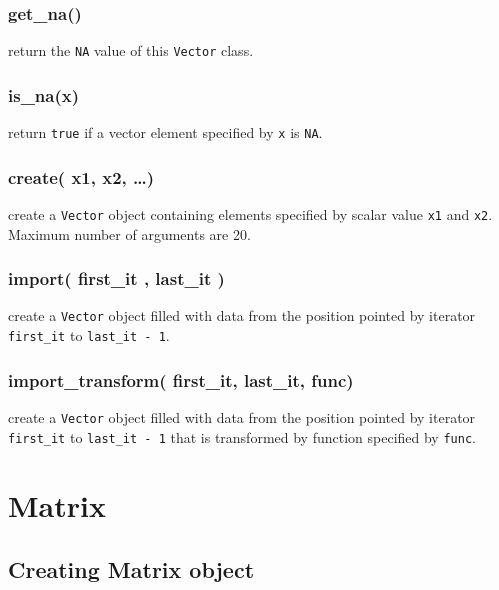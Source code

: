 \documentclass[]{book}
\begin{document}
\hypertarget{get_na}{%
\subsection{get\_na()}\label{get_na}}

return the \texttt{NA} value of this \texttt{Vector} class.

\hypertarget{is_nax}{%
\subsection{is\_na(x)}\label{is_nax}}

return \texttt{true} if a vector element specified by \texttt{x} is \texttt{NA}.

\hypertarget{create-x1-x2}{%
\subsection{create( x1, x2, \ldots{})}\label{create-x1-x2}}

create a \texttt{Vector} object containing elements specified by scalar value \texttt{x1} and \texttt{x2}. Maximum number of arguments are 20.

\hypertarget{import-first_it-last_it}{%
\subsection{import( first\_it , last\_it )}\label{import-first_it-last_it}}

create a \texttt{Vector} object filled with data from the position pointed by iterator \texttt{first\_it} to \texttt{last\_it\ -\ 1}.

\hypertarget{import_transform-first_it-last_it-func}{%
\subsection{import\_transform( first\_it, last\_it, func)}\label{import_transform-first_it-last_it-func}}

create a \texttt{Vector} object filled with data from the position pointed by iterator \texttt{first\_it} to \texttt{last\_it\ -\ 1} that is transformed by function specified by \texttt{func}.

\hypertarget{matrix}{%
\chapter{Matrix}\label{matrix}}

\hypertarget{creating-matrix-object}{%
\section{Creating Matrix object}\label{creating-matrix-object}}
\end{document}
